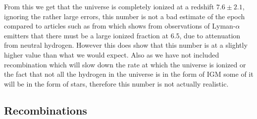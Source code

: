	From this we get that the universe is completely ionized at a redshift $7.6\pm2.1$, ignoring the rather large errors, this number is not a bad estimate of the epoch compared to articles such as from \cite{Ota:arXiv0707.1561} which shows from observations of Lyman-$\alpha$ emitters that there must be a large ionized fraction at 6.5, due to attenuation from neutral hydrogen. However this does show that this number is at a slightly higher value than what we would expect. Also as we have not included recombination which will slow down the rate at which the universe is ionized or the fact that not all the hydrogen in the universe is in the form of IGM some of it will be in the form of stars, therefore this number is not actually realistic.

\subsection{Recombinations} %
\label{sub:recombinations}

